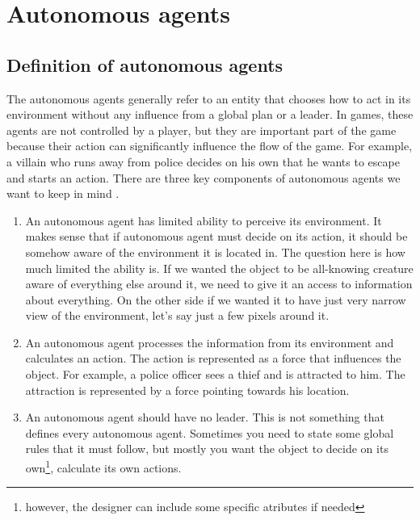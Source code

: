 \documentclass[10pt,twoside,english,a4paper]{article}
\begin{document}
\section{Autonomous agents} \label{autonomous agents}

\subsection{Definition of autonomous agents} \label{definition of a.a.}

The autonomous agents generally refer to an entity that chooses 
how to act in its environment without any influence from a global 
plan or a leader. In games, these agents are not controlled by a 
player, but they are important part of the game because their action
can significantly influence the flow of the game. For example, 
a villain who runs away from police decides on his own that he
wants to escape and starts an action. There are three key 
components of autonomous agents we want to keep in mind 
\cite{Verhagen}. 

\begin{enumerate}
\item An autonomous agent has limited ability to perceive its 
environment. It makes sense that if autonomous agent must decide 
on its action, it should be somehow aware of the environment it 
is located in. The question here is how much limited the ability is. 
If we wanted the object to be all-knowing creature aware of 
everything else around it, we need to give it an access to 
information about everything. On the other side if we wanted it 
to have just very narrow view of the environment, let’s say just 
a few pixels around it.

\item An autonomous agent processes the information from its 
environment and calculates an action. The action is represented 
as a force that influences the object. For example, a police 
officer sees a thief and is attracted to him. The attraction is 
represented by a force pointing towards his location. 

\item An autonomous agent should have no leader. This is not 
something that defines every autonomous agent. Sometimes you need 
to state some global rules that it must follow, but mostly you want 
the object to decide on its own\footnote{however, the designer can 
include some specific atributes if needed}, calculate its own 
actions.

\end{enumerate}
\end{document}
